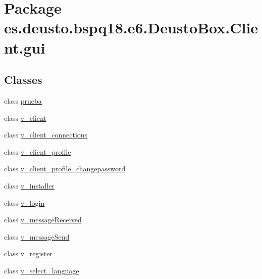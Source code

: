 \hypertarget{namespacees_1_1deusto_1_1bspq18_1_1e6_1_1_deusto_box_1_1_client_1_1gui}{}\section{Package es.\+deusto.\+bspq18.\+e6.\+Deusto\+Box.\+Client.\+gui}
\label{namespacees_1_1deusto_1_1bspq18_1_1e6_1_1_deusto_box_1_1_client_1_1gui}
\subsection*{Classes}
\begin{DoxyCompactItemize}
\item 
class \mbox{\hyperlink{classes_1_1deusto_1_1bspq18_1_1e6_1_1_deusto_box_1_1_client_1_1gui_1_1prueba}{prueba}}
\item 
class \mbox{\hyperlink{classes_1_1deusto_1_1bspq18_1_1e6_1_1_deusto_box_1_1_client_1_1gui_1_1v__client}{v\+\_\+client}}
\item 
class \mbox{\hyperlink{classes_1_1deusto_1_1bspq18_1_1e6_1_1_deusto_box_1_1_client_1_1gui_1_1v__client__connections}{v\+\_\+client\+\_\+connections}}
\item 
class \mbox{\hyperlink{classes_1_1deusto_1_1bspq18_1_1e6_1_1_deusto_box_1_1_client_1_1gui_1_1v__client__profile}{v\+\_\+client\+\_\+profile}}
\item 
class \mbox{\hyperlink{classes_1_1deusto_1_1bspq18_1_1e6_1_1_deusto_box_1_1_client_1_1gui_1_1v__client__profile__changepassword}{v\+\_\+client\+\_\+profile\+\_\+changepassword}}
\item 
class \mbox{\hyperlink{classes_1_1deusto_1_1bspq18_1_1e6_1_1_deusto_box_1_1_client_1_1gui_1_1v__installer}{v\+\_\+installer}}
\item 
class \mbox{\hyperlink{classes_1_1deusto_1_1bspq18_1_1e6_1_1_deusto_box_1_1_client_1_1gui_1_1v__login}{v\+\_\+login}}
\item 
class \mbox{\hyperlink{classes_1_1deusto_1_1bspq18_1_1e6_1_1_deusto_box_1_1_client_1_1gui_1_1v__message_received}{v\+\_\+message\+Received}}
\item 
class \mbox{\hyperlink{classes_1_1deusto_1_1bspq18_1_1e6_1_1_deusto_box_1_1_client_1_1gui_1_1v__message_send}{v\+\_\+message\+Send}}
\item 
class \mbox{\hyperlink{classes_1_1deusto_1_1bspq18_1_1e6_1_1_deusto_box_1_1_client_1_1gui_1_1v__register}{v\+\_\+register}}
\item 
class \mbox{\hyperlink{classes_1_1deusto_1_1bspq18_1_1e6_1_1_deusto_box_1_1_client_1_1gui_1_1v__select__language}{v\+\_\+select\+\_\+language}}
\end{DoxyCompactItemize}
